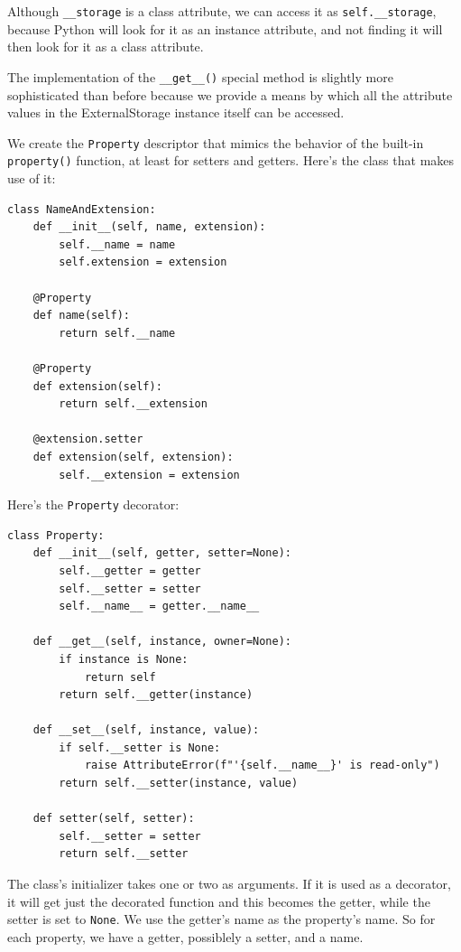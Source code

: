 Although \verb|__storage| is a class attribute, we can access it as \verb|self.__storage|, because Python will look for it as an instance attribute, and not finding it will then look for it as a class attribute.

The implementation of the \verb|__get__()| special method is slightly more sophisticated than before because we provide a means by which all the attribute values in the ExternalStorage instance itself can be accessed.


We create the \verb|Property| descriptor that mimics the behavior of the built-in \verb|property()| function, at least for setters and getters.
Here's the class that makes use of it:
\begin{lstlisting}
class NameAndExtension:
    def __init__(self, name, extension):
        self.__name = name
        self.extension = extension

    @Property
    def name(self):
        return self.__name

    @Property
    def extension(self):
        return self.__extension

    @extension.setter
    def extension(self, extension):
        self.__extension = extension  
\end{lstlisting}


Here's the \verb|Property| decorator:
\begin{lstlisting}
class Property:
    def __init__(self, getter, setter=None):
        self.__getter = getter
        self.__setter = setter
        self.__name__ = getter.__name__

    def __get__(self, instance, owner=None):
        if instance is None:
            return self
        return self.__getter(instance)

    def __set__(self, instance, value):
        if self.__setter is None:
            raise AttributeError(f"'{self.__name__}' is read-only")
        return self.__setter(instance, value)

    def setter(self, setter):
        self.__setter = setter
        return self.__setter
\end{lstlisting}

The class's initializer takes one or two  as arguments.
If it is used as a decorator, it will get just the decorated function and this becomes the getter, while the setter is set to \verb|None|.
We use the getter's name as the property's name.
So for each property, we have a getter, possiblely a setter, and a name.

